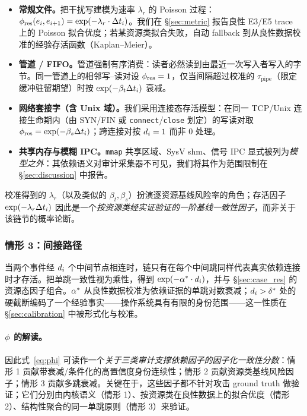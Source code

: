 \begin{itemize}
\item \textbf{常规文件。}把干扰写建模为速率 $\lambda_r$ 的 Poisson 过程：$\phi_{\text{res}}(e_i, e_{i+1}) = \exp(-\lambda_r \cdot \Delta t_i)$。我们在 \S\ref{sec:metric} 报告良性 E3/E5 trace 上的 Poisson 拟合优度；若某资源类拟合失败，自动 fallback 到从良性数据校准的经验存活函数（Kaplan--Meier）。
\item \textbf{管道 / FIFO。}管道强制有序消费：读者必然读到由最近一次写入者写入的字节。同一管道上的相邻写--读对设 $\phi_{\text{res}} = 1$，仅当间隔超过校准的 $\tau_{\text{pipe}}$（限定缓冲驻留期望）时按 $\exp(-\beta_t \Delta t_i)$ 衰减。
\item \textbf{网络套接字（含 Unix 域）。}我们采用连接态存活模型：在同一 TCP/Unix 连接生命期内（由 SYN/FIN 或 \texttt{connect}/\texttt{close} 划定）的写读对取 $\phi_{\text{res}} = \exp(-\beta_s \Delta t_i)$；跨连接对按 $d_i = 1$ 而非 $0$ 处理。
\item \textbf{共享内存与模糊 IPC。}\texttt{mmap} 共享区域、SysV shm、信号 IPC 显式被列为\emph{模型之外}：其依赖语义对审计采集器不可见，我们将其作为范围限制在 \S\ref{sec:discussion} 中报告。
\end{itemize}

校准得到的 $\lambda_r$（以及类似的 $\beta_t, \beta_s$）扮演逐资源基线风险率的角色；存活因子 $\exp(-\lambda_r \Delta t_i)$ 因此是一个\emph{按资源类经实证验证的一阶基线一致性因子}，而非关于该链节的概率论断。

\subsubsection{情形 3：间接路径}

当两个事件经 $d_i$ 个中间节点相连时，链只有在每个中间跳同样代表真实依赖连接时才存活。把单跳一致性视为乘性，得到 $\exp(-\alpha^* \cdot d_i)$，并与 \S\ref{sec:case_res} 的资源态因子组合。$\alpha^*$ 从良性数据校准为依赖证据的单跳对数衰减；$d_i > \delta^*$ 处的硬截断编码了一个经验事实——操作系统具有有限的身份范围——这一性质在 \S\ref{sec:calibration} 中被形式化与校准。

\paragraph{$\phi$ 的解读。}因此式~\ref{eq:phi} 可读作一个\emph{关于三类审计支撑依赖因子的因子化一致性分数}：情形 1 贡献带衰减/条件化的高置信度身份连续性；情形 2 贡献资源类基线风险因子；情形 3 贡献多跳衰减。关键在于，这些因子都不针对攻击 ground truth 做验证；它们分别由内核语义（情形 1）、按资源类在良性数据上的拟合优度（情形 2）、结构性聚合的同一单跳原则（情形 3）来验证。

